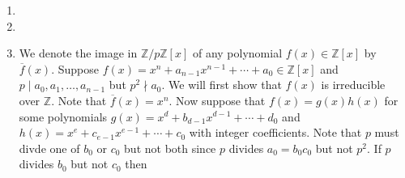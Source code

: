 \documentclass[12pt]{article}
\begin{document}
\begin{enumerate}
\item %
\item %
\item %
We denote the image 
in $\mathbb{Z}/p\mathbb{Z}\left[x\right]$ 
of any polynomial $f\left(x\right)\in\mathbb{Z}\left[x\right]$
by $\overline{f}\left(x\right)$.
Suppose $f\left(x\right)=x^n+a_{n-1}x^{n-1}+\cdots+a_0
\in\mathbb{Z}\left[x\right]$
and $p\mid a_0,a_1,\ldots,a_{n-1}$ but $p^2\nmid a_0$.
We will first show that $f\left(x\right)$
is irreducible over $\mathbb{Z}$.
Note that $\overline{f}\left(x\right)=x^n$.
Now suppose that $f\left(x\right)=g\left(x\right)h\left(x\right)$
for some polynomials $g\left(x\right)
=x^d+b_{d-1}x^{d-1}+\cdots+d_0$
and $h\left(x\right)=x^e+c_{e-1}x^{e-1}+\cdots+c_0$
with integer coefficients.
Note that $p$ must divde one of $b_0$ or $c_0$ but
not both since $p$ divides $a_0=b_0c_0$ but not $p^2$.
If $p$ divides $b_0$ but not $c_0$ then

\end{enumerate}
\end{document}
